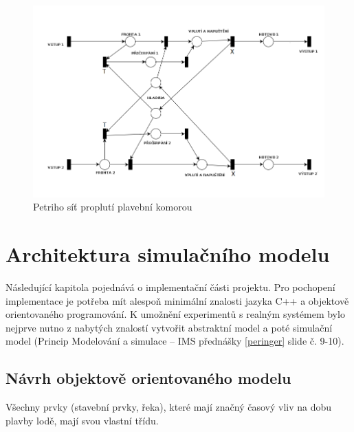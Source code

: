 \documentclass[11pt,a4paper]{article}
\begin{document}
      \begin{figure}[H]
        \centering
        \includegraphics[width=1\textwidth, natwidth=940, natheight=325]
                        {petri_net_2.png}
        \caption{Petriho síť proplutí plavební komorou \label{petri_2}}
      \end{figure}

  \section{Architektura simulačního modelu}

    Následující kapitola pojednává o implementační části projektu. Pro pochopení
    implementace je potřeba mít alespoň minimální znalosti jazyka C++ a 
    objektově orientovaného programování.
    K umožnění experimentů s realným systémem bylo nejprve nutno z nabytých znalostí
    vytvořit abstraktní model a poté simulační model (Princip Modelování a 
    simulace -- IMS přednášky \ref{peringer} slide č. 9-10).

    \subsection{Návrh objektově orientovaného modelu}
    
      Všechny prvky (stavební prvky, řeka), které mají značný časový vliv na
      dobu plavby lodě, mají svou vlastní třídu.
\end{document}
